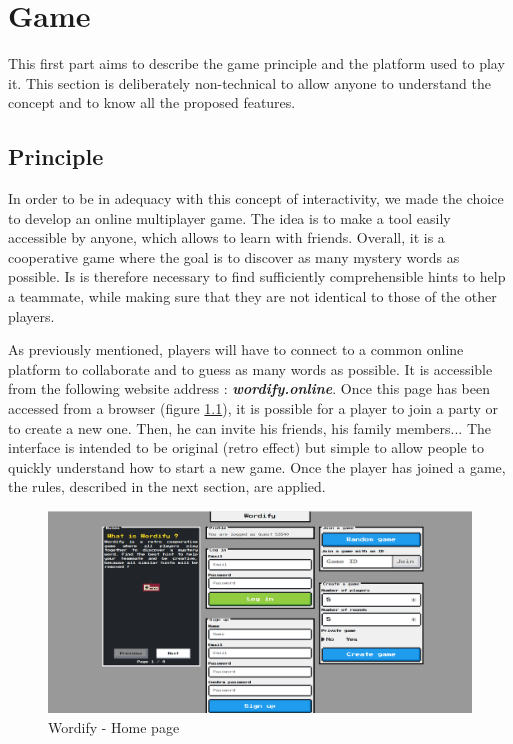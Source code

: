 \documentclass{tnreport}
\begin{document}
\cleardoublepage

\chapter{Game}

This first part aims to describe the game principle and the platform used to play it. This section is deliberately non-technical to allow anyone to understand the concept and to know all the proposed features. 

\section{Principle}

In order to be in adequacy with this concept of interactivity, we made the choice to develop an online multiplayer game. The idea is to make a tool easily accessible by anyone, which allows to learn with friends. Overall, it is a cooperative game where the goal is to discover as many mystery words as possible. Is is therefore necessary to find sufficiently comprehensible hints to help a teammate, while making sure that they are not identical to those of the other players.

As previously mentioned, players will have to connect to a common online platform to collaborate and to guess as many words as possible. It is accessible from the following website address : \textbf{\textit{wordify.online}}. Once this page has been accessed from a browser (figure \ref{fig:wordify_home_page}), it is possible for a player to join a party or to create a new one. Then, he can invite his friends, his family members... The interface is intended to be original (retro effect) but simple to allow people to quickly understand how to start a new game. Once the player has joined a game, the rules, described in the next section, are applied. 

\bigskip

\begin{figure}[ht]
	\centering
	\fboxsep=1.2pt
	\includegraphics[scale=0.4]{figures/wordify_home_page}
	\caption{Wordify - Home page}
	\label{fig:wordify_home_page}
\end{figure} 
\end{document}
